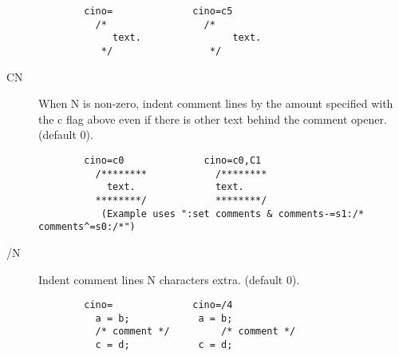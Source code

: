 \begin{description}
\begin{verbatim}
        cino=              cino=c5
          /*                 /*
             text.                text.
           */                 */
 \end{verbatim}
    \item[CN] When N is non-zero, indent comment lines by the amount specified
          with the c flag above even if there is other text behind the
          comment opener.  (default 0).
\begin{verbatim}
        cino=c0              cino=c0,C1
          /********            /********
            text.              text.
          ********/            ********/
           (Example uses ":set comments & comments-=s1:/* comments^=s0:/*")
\end{verbatim}
    \item[/N]    Indent comment lines N characters extra.  (default 0).
\begin{verbatim}
        cino=              cino=/4
          a = b;            a = b;
          /* comment */         /* comment */
          c = d;            c = d;
 \end{verbatim}
 

\end{description}
